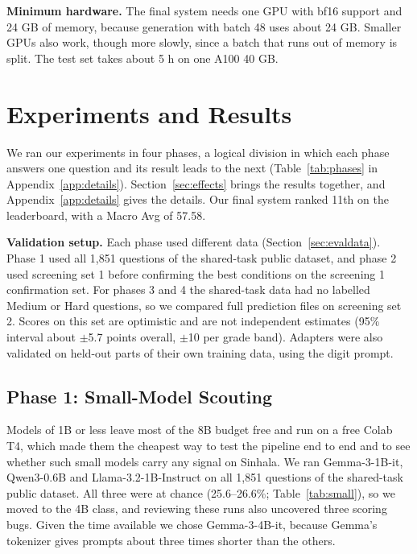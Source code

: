 \documentclass[11pt]{article}
\newcommand{\para}[1]{\smallskip\noindent\textbf{#1}\enspace}
\begin{document}
\para{Minimum hardware.} The final system needs one GPU with bf16 support and 24 GB of memory, because generation with batch 48 uses about 24 GB. Smaller GPUs also work, though more slowly, since a batch that runs out of memory is split. The test set takes about 5 h on one A100 40 GB.

\section{Experiments and Results}\label{sec:results}
We ran our experiments in four phases, a logical division in which each phase answers one question and its result leads to the next (Table~\ref{tab:phases} in Appendix~\ref{app:details}). Section~\ref{sec:effects} brings the results together, and Appendix~\ref{app:details} gives the details. Our final system ranked 11th on the leaderboard, with a Macro Avg of 57.58.

\para{Validation setup.} Each phase used different data (Section~\ref{sec:evaldata}). Phase 1 used all 1,851 questions of the shared-task public dataset, and phase 2 used screening set 1 before confirming the best conditions on the screening 1 confirmation set. For phases 3 and 4 the shared-task data had no labelled Medium or Hard questions, so we compared full prediction files on screening set 2. Scores on this set are optimistic and are not independent estimates (95\% interval about $\pm$5.7 points overall, $\pm$10 per grade band). Adapters were also validated on held-out parts of their own training data, using the digit prompt.

\subsection{Phase 1: Small-Model Scouting}
Models of 1B or less leave most of the 8B budget free and run on a free Colab T4, which made them the cheapest way to test the pipeline end to end and to see whether such small models carry any signal on Sinhala. We ran Gemma-3-1B-it, Qwen3-0.6B and Llama-3.2-1B-Instruct on all 1,851 questions of the shared-task public dataset. All three were at chance (25.6--26.6\%; Table~\ref{tab:small}), so we moved to the 4B class, and reviewing these runs also uncovered three scoring bugs. Given the time available we chose Gemma-3-4B-it, because Gemma's tokenizer gives prompts about three times shorter than the others.
\end{document}
